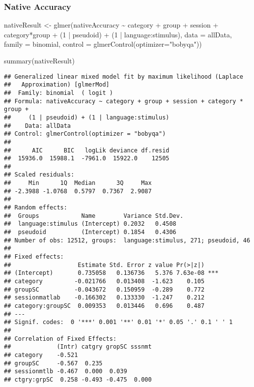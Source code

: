 \documentclass[
]{article}
\newenvironment{Shaded}{\begin{snugshade}}{\end{snugshade}}
\newcommand{\AttributeTok}[1]{\textcolor[rgb]{0.77,0.63,0.00}{#1}}
\newcommand{\DecValTok}[1]{\textcolor[rgb]{0.00,0.00,0.81}{#1}}
\newcommand{\FunctionTok}[1]{\textcolor[rgb]{0.00,0.00,0.00}{#1}}
\newcommand{\NormalTok}[1]{#1}
\newcommand{\OtherTok}[1]{\textcolor[rgb]{0.56,0.35,0.01}{#1}}
\newcommand{\SpecialCharTok}[1]{\textcolor[rgb]{0.00,0.00,0.00}{#1}}
\newcommand{\StringTok}[1]{\textcolor[rgb]{0.31,0.60,0.02}{#1}}
\begin{document}
\hypertarget{native-accuracy}{%
\subsubsection{Native Accuracy}\label{native-accuracy}}

\begin{Shaded}
\begin{Highlighting}[]
\NormalTok{nativeResult }\OtherTok{\textless{}{-}} \FunctionTok{glmer}\NormalTok{(nativeAccuracy }\SpecialCharTok{\textasciitilde{}}\NormalTok{ category }\SpecialCharTok{+}\NormalTok{ group }\SpecialCharTok{+}\NormalTok{ session }\SpecialCharTok{+}\NormalTok{ category}\SpecialCharTok{*}\NormalTok{group }\SpecialCharTok{+}
\NormalTok{        (}\DecValTok{1} \SpecialCharTok{|}\NormalTok{ pseudoid) }\SpecialCharTok{+}\NormalTok{ (}\DecValTok{1} \SpecialCharTok{|}\NormalTok{ language}\SpecialCharTok{:}\NormalTok{stimulus), }
      \AttributeTok{data =}\NormalTok{ allData,}
      \AttributeTok{family =}\NormalTok{ binomial,}
      \AttributeTok{control =} \FunctionTok{glmerControl}\NormalTok{(}\AttributeTok{optimizer=}\StringTok{"bobyqa"}\NormalTok{))}

\FunctionTok{summary}\NormalTok{(nativeResult)}
\end{Highlighting}
\end{Shaded}

\begin{verbatim}
## Generalized linear mixed model fit by maximum likelihood (Laplace
##   Approximation) [glmerMod]
##  Family: binomial  ( logit )
## Formula: nativeAccuracy ~ category + group + session + category * group +  
##     (1 | pseudoid) + (1 | language:stimulus)
##    Data: allData
## Control: glmerControl(optimizer = "bobyqa")
## 
##      AIC      BIC   logLik deviance df.resid 
##  15936.0  15988.1  -7961.0  15922.0    12505 
## 
## Scaled residuals: 
##     Min      1Q  Median      3Q     Max 
## -2.3988 -1.0768  0.5797  0.7367  2.9087 
## 
## Random effects:
##  Groups            Name        Variance Std.Dev.
##  language:stimulus (Intercept) 0.2032   0.4508  
##  pseudoid          (Intercept) 0.1854   0.4306  
## Number of obs: 12512, groups:  language:stimulus, 271; pseudoid, 46
## 
## Fixed effects:
##                   Estimate Std. Error z value Pr(>|z|)    
## (Intercept)       0.735058   0.136736   5.376 7.63e-08 ***
## category         -0.021766   0.013408  -1.623    0.105    
## groupSC          -0.043672   0.150959  -0.289    0.772    
## sessionmatlab    -0.166302   0.133330  -1.247    0.212    
## category:groupSC  0.009353   0.013446   0.696    0.487    
## ---
## Signif. codes:  0 '***' 0.001 '**' 0.01 '*' 0.05 '.' 0.1 ' ' 1
## 
## Correlation of Fixed Effects:
##             (Intr) catgry gropSC sssnmt
## category    -0.521                     
## groupSC     -0.567  0.235              
## sessionmtlb -0.467  0.000  0.039       
## ctgry:grpSC  0.258 -0.493 -0.475  0.000
\end{verbatim}
\end{document}
